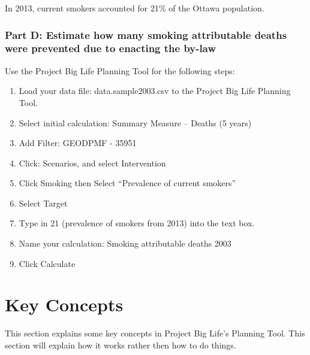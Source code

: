 \documentclass[]{book}
\begin{document}
In 2013, current smokers accounted for 21\% of the Ottawa population.

\subsection{Part D: Estimate how many smoking attributable deaths were
prevented due to enacting the
by-law}\label{part-d-estimate-how-many-smoking-attributable-deaths-were-prevented-due-to-enacting-the-by-law}

Use the Project Big Life Planning Tool for the following steps:

\begin{enumerate}
\def\labelenumi{\arabic{enumi}.}
\item
  Load your data file: data.sample2003.csv to the Project Big Life
  Planning Tool.
\item
  Select initial calculation: Summary Measure -- Deaths (5 years)
\item
  Add Filter: GEODPMF - 35951
\item
  Click: Scenarios, and select Intervention
\item
  Click Smoking then Select ``Prevalence of current smokers''
\item
  Select Target
\item
  Type in 21 (prevalence of smokers from 2013) into the text box.
\item
  Name your calculation: Smoking attributable deaths 2003
\item
  Click Calculate
\end{enumerate}

\hypertarget{keyconcepts}{\chapter{Key Concepts}\label{keyconcepts}}

This section explains some key concepts in Project Big Life's Planning
Tool. This section will explain how it works rather then how to do
things.
\end{document}
